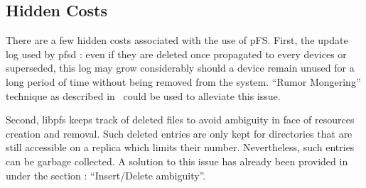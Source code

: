 \subsection{Hidden Costs}

There are a few hidden costs associated with the use of pFS. First, the
update log used by pfsd : even if they are deleted once propagated to
every devices or superseded, this log may grow considerably should a
device remain unused for a long period of time without being removed
from the system. ``Rumor Mongering'' technique as described
in~\cite{demers:epidemic} could be used to alleviate this issue.

Second, libpfs keeps track of deleted files to avoid ambiguity in face
of resources creation and removal. Such deleted entries are only kept
for directories that are still accessible on a replica which limits
their number. Nevertheless, such entries can be garbage collected. A
solution to this issue has already been provided in~\cite{page:ficus}
under the section : ``Insert/Delete ambiguity''.

\endinput


